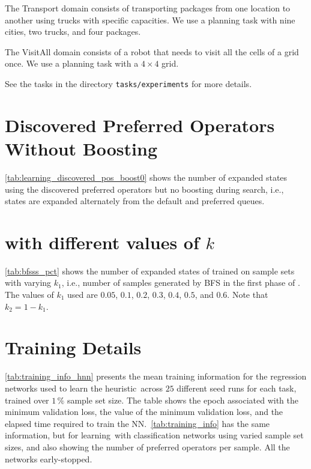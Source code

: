 \documentclass[ppgc,diss,english]{iiufrgs}
\begin{document}
The Transport domain consists of transporting packages from one location to another using trucks with specific capacities. We use a planning task with nine cities, two trucks, and four packages.

The VisitAll domain consists of a robot that needs to visit all the cells of a grid once. We use a planning task with a $4 \times 4$ grid.

See the tasks in the directory \texttt{tasks/experiments} for more details.

\chapter[Preferred Operators Without Boosting]{Discovered Preferred Operators Without Boosting}
\label{cha:discovered_pos_boost0}
\cref{tab:learning_discovered_pos_boost0} shows the number of expanded states using the discovered preferred operators \pog but no boosting during search, i.e., states are expanded alternately from the default and preferred queues.



\chapter{\bfsrs with different values of $k$}
\label{cha:bfsss_pct}

\cref{tab:bfsss_pct} shows the number of expanded states of \pog trained on sample sets with varying $k_{1}$, i.e., number of samples generated by BFS in the first phase of \bfsrs. The values of $k_{1}$ used are $0.05$, $0.1$, $0.2$, $0.3$, $0.4$, $0.5$, and $0.6$. Note that $k_{2} = 1 - k_{1}$.



\chapter{Training Details}
\label{cha:training_details}

\cref{tab:training_info_hnn} presents the mean training information for the regression networks used to learn the heuristic~\hnn across $25$ different seed runs for each task, trained over $1\,\%$ sample set size. The table shows the epoch associated with the minimum validation loss, the value of the minimum validation loss, and the elapsed time required to train the NN.~\cref{tab:training_info} has the same information, but for learning~\pog with classification networks using varied sample set sizes, and also showing the number of preferred operators per sample. All the networks early-stopped.
\end{document}
